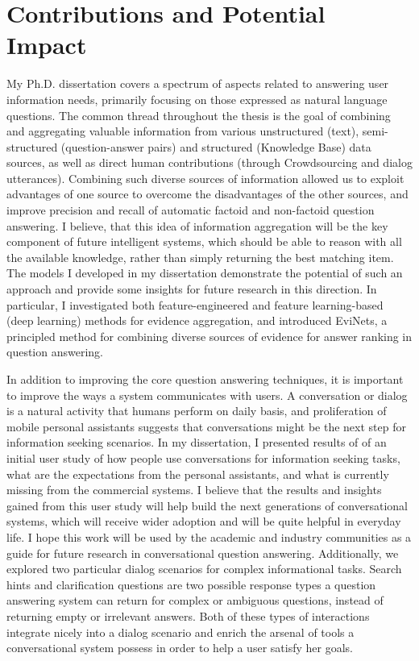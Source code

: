 \section{Contributions and Potential Impact}
\label{section:conclusion:contributions}

My Ph.D. dissertation covers a spectrum of aspects related to answering user information needs, primarily focusing on those expressed as natural language questions.
The common thread throughout the thesis is the goal of combining and aggregating valuable information from various unstructured (text), semi-structured (question-answer pairs) and structured (Knowledge Base) data sources, as well as direct human contributions (through Crowdsourcing and dialog utterances).
Combining such diverse sources of information allowed us to exploit advantages of one source to overcome the disadvantages of the other sources, and improve precision and recall of automatic factoid and non-factoid question answering.
I believe, that this idea of information aggregation will be the key component of future intelligent systems, which should be able to reason with all the available knowledge, rather than simply returning the best matching item.
The models I developed in my dissertation demonstrate the potential of such an approach and provide some insights for future research in this direction. In particular, I investigated both feature-engineered and feature learning-based (deep learning) methods for evidence aggregation, and introduced EviNets, a principled method for combining diverse sources of evidence for answer ranking in question answering.

In addition to improving the core question answering techniques, it is important to improve the ways a system communicates with users.
A conversation or dialog is a natural activity that humans perform on daily basis, and proliferation of mobile personal assistants suggests that conversations might be the next step for information seeking scenarios.
In my dissertation, I presented results of of an initial user study of how people use conversations for information seeking tasks, what are the expectations from the personal assistants, and what is currently missing from the commercial systems.
I believe that the results and insights gained from this user study will help build the next generations of conversational systems, which will receive wider adoption and will be quite helpful in everyday life.
I hope this work will be used by the academic and industry communities as a guide for future research in conversational question answering.
Additionally, we explored two particular dialog scenarios for complex informational tasks.
Search hints and clarification questions are two possible response types a question answering system can return for complex or ambiguous questions, instead of returning empty or irrelevant answers.
Both of these types of interactions integrate nicely into a dialog scenario and enrich the arsenal of tools a conversational system possess in order to help a user satisfy her goals.

